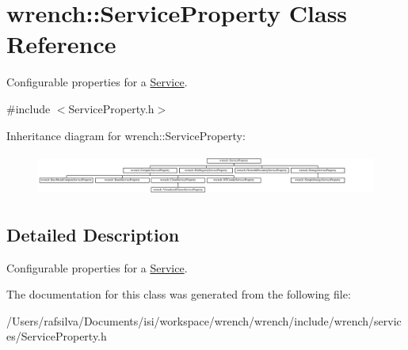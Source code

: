 \hypertarget{classwrench_1_1_service_property}{}\section{wrench\+:\+:Service\+Property Class Reference}
\label{classwrench_1_1_service_property}


Configurable properties for a \hyperlink{classwrench_1_1_service}{Service}.  




{\ttfamily \#include $<$Service\+Property.\+h$>$}

Inheritance diagram for wrench\+:\+:Service\+Property\+:\begin{figure}[H]
\begin{center}
\leavevmode
\includegraphics[height=1.393035cm]{classwrench_1_1_service_property}
\end{center}
\end{figure}


\subsection{Detailed Description}
Configurable properties for a \hyperlink{classwrench_1_1_service}{Service}. 

The documentation for this class was generated from the following file\+:\begin{DoxyCompactItemize}
\item 
/\+Users/rafsilva/\+Documents/isi/workspace/wrench/wrench/include/wrench/services/Service\+Property.\+h\end{DoxyCompactItemize}
